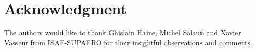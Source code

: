 \documentclass[letterpaper, 10 pt, conference]{ieeeconf}
\begin{document}


\section*{Acknowledgment}
The authors would like to thank Ghislain Haine, Michel Salau\"n and Xavier Vasseur from ISAE-SUPAERO for their insightful observations and comments.




%
%



%
%
\end{document}

